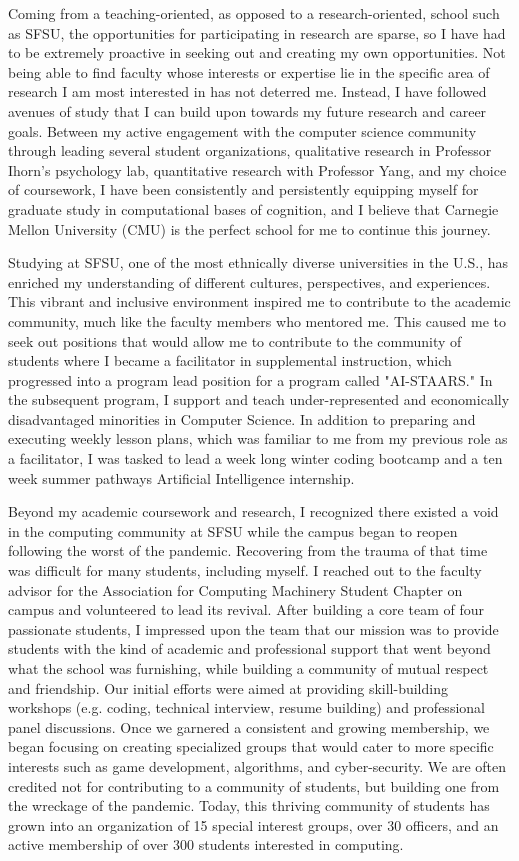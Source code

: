 \documentclass[10pt]{article}
\begin{document}
Coming from a teaching-oriented, as opposed to a research-oriented, school such as SFSU, the opportunities for participating in research are
sparse, so I have had to be extremely proactive in seeking out and creating my own opportunities. Not being able to find faculty
whose interests or expertise lie in the specific area of research I am most interested in has not deterred me. Instead, I have followed
avenues of study that I can build upon towards my future research and career goals. Between my active engagement with the computer science
community through leading several student organizations, qualitative research in Professor Ihorn's psychology lab, quantitative research
with Professor Yang, and my choice of coursework, I have been consistently and persistently equipping myself for graduate study in
computational bases of cognition, and I believe that Carnegie Mellon University (CMU) is the perfect school for me to continue this journey.

Studying at SFSU, one of the most ethnically diverse universities in the U.S., has enriched my understanding of different cultures,
perspectives, and experiences. This vibrant and inclusive environment inspired me to contribute to the academic community, much like the
faculty members who mentored me. This caused me to seek out positions that would allow me to contribute to the community of students where
I became a facilitator in supplemental instruction, which progressed into a program lead position for a program called "AI-STAARS." In the
subsequent program, I support and teach under-represented and economically disadvantaged minorities in Computer Science.  In addition to
preparing and executing weekly lesson plans, which was familiar to me from my previous role as a facilitator, I was tasked to lead a week
long winter coding bootcamp and a ten week summer pathways Artificial Intelligence internship.

Beyond my academic coursework and research, I recognized there existed a void in the computing community at SFSU while the campus began to
reopen following the worst of the pandemic. Recovering from the trauma of that time was difficult for many students, including myself. I
reached out to the faculty advisor for the Association for Computing Machinery Student Chapter on campus and volunteered to lead its
revival. After building a core team of four passionate students, I impressed upon the team that our mission was to provide students with
the kind of academic and professional support that went beyond what the school was furnishing, while building a community of mutual respect
and friendship.  Our initial efforts were aimed at providing skill-building workshops (e.g. coding, technical interview, resume building)
and professional panel discussions.  Once we garnered a consistent and growing membership, we began focusing on creating specialized groups
that would cater to more specific interests such as game development, algorithms, and cyber-security.  We are often credited not for
contributing to a community of students, but building one from the wreckage of the pandemic.  Today, this thriving community of students
has grown into an organization of 15 special interest groups, over 30 officers, and an active membership of over 300 students interested in
computing.
\end{document}
